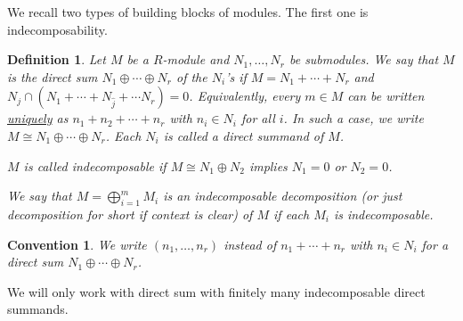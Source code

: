 \documentclass[11pt,a4paper]{article}
\numberwithin{equation}{section}
\theoremstyle{all}
\newtheorem{definition}[theorem]{Definition}
\newtheorem*{convention}{Convention}
\theoremstyle{remark}
\newcommand{\defn}[1]{\textsl{\color{darkblue} #1}}
\begin{document}
We recall two types of building blocks of modules.  The first one is indecomposability.

\begin{definition}
Let $M$ be a $R$-module and $N_1,\ldots, N_r$ be submodules.
We say that $M$ is the \defn{direct sum} $N_1\oplus \cdots \oplus N_r$ of the $N_i$'s if $M=N_1+\cdots +N_r$ and $N_j\cap (N_1+\cdots +N_{\hat{j}}+\cdots N_r)=0$.  Equivalently, every $m\in M$ can be written \uline{uniquely} as $n_1+n_2+\cdots +n_r$ with $n_i\in N_i$ for all $i$.
In such a case, we write $M\cong N_1\oplus \cdots \oplus N_r$. 
Each $N_i$ is called a \defn{direct summand} of $M$.

$M$ is called \defn{indecomposable} if $M\cong N_1\oplus N_2$ implies $N_1=0$ or $N_2=0$.

We say that $M=\bigoplus_{i=1}^m M_i$ is an \defn{indecomposable decomposition} (or just decomposition for short if context is clear) of $M$ if each $M_i$ is indecomposable.  
\end{definition}

\begin{convention}
We write $(n_1,\ldots, n_r)$ instead of $n_1+\cdots+n_r$ with $n_i \in N_i$ for a direct sum $N_1\oplus \cdots \oplus N_r$.
\end{convention}

We will only work with direct sum with finitely many indecomposable direct summands.

\end{document}
